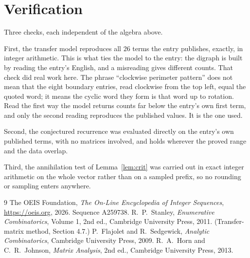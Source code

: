 \documentclass[11pt,a4paper]{article}
\theoremstyle{plain}
\theoremstyle{definition}
\begin{document}
\section{Verification}

Three checks, each independent of the algebra above.

First, the transfer model reproduces all $26$ terms the entry publishes, exactly, in
integer arithmetic. This is what ties the model to the entry: the digraph is built by reading
the entry's English, and a misreading gives different counts. That check did real work here. The phrase ``clockwise perimeter pattern'' does not mean that the eight boundary entries, read clockwise from the top left, equal the quoted word; it means the cyclic word they form is that word up to rotation. Read the first way the model returns counts far below the entry's own first term, and only the second reading reproduces the published values. It is the one used.

Second, the conjectured recurrence was evaluated directly on the entry's own published terms,
with no matrices involved, and holds wherever the proved range and the data overlap.

Third, the annihilation test of Lemma~\ref{lem:crit} was carried out in exact integer
arithmetic on the whole vector rather than on a sampled prefix, so no rounding or sampling
enters anywhere.

\begin{thebibliography}{9}
 The OEIS Foundation, \emph{The On-Line Encyclopedia of Integer
Sequences}, \url{https://oeis.org}, 2026. Sequence A259738.
 R.~P.~Stanley, \emph{Enumerative Combinatorics}, Volume 1, 2nd ed.,
Cambridge University Press, 2011. (Transfer-matrix method, Section 4.7.)
 P.~Flajolet and R.~Sedgewick, \emph{Analytic Combinatorics}, Cambridge
University Press, 2009.
 R.~A.~Horn and C.~R.~Johnson, \emph{Matrix Analysis}, 2nd ed., Cambridge
University Press, 2013.
\end{thebibliography}
\end{document}

